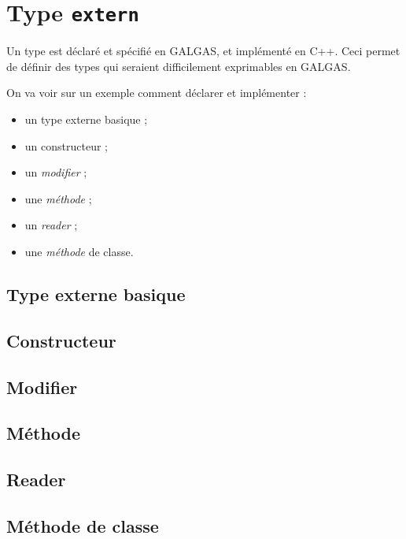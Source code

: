 
\chapter{Type \texttt{extern}}


Un type  est déclaré et spécifié en GALGAS, et implémenté en C++. Ceci permet de définir des types qui seraient difficilement exprimables en GALGAS. 

On va voir sur un exemple comment déclarer et implémenter :
\begin{itemize}
  \item un type externe basique ;
  \item un constructeur ;
  \item un \emph{modifier} ;
  \item une \emph{méthode} ;
  \item un \emph{reader} ;
  \item une \emph{méthode} de classe.
\end{itemize}


\section{Type externe basique}

\section{Constructeur}


\section{Modifier}


\section{Méthode}


\section{Reader}


\section{Méthode de classe}

